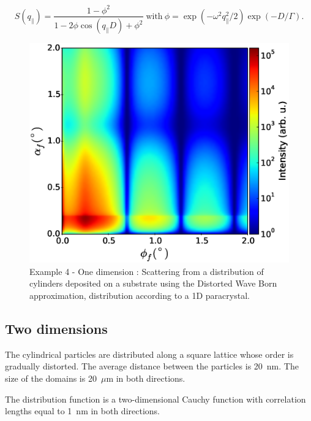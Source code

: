 \begin{equation*}
S(q_{\parallel})= \frac{1-\phi^2 }{1-2\phi\cos(q_{\parallel} D)+\phi^2} \; \textrm{with} \ \phi=\exp(-\omega^2 q_{\parallel}^2/2)\exp(-D/\Gamma).
\end{equation*}


\begin{figure}[H]
\includegraphics[width=.49\textwidth]{Figures/figure_ex0041DDL.eps}
\caption{Example 4 - One dimension : Scattering from a distribution of cylinders deposited on a substrate using the Distorted Wave Born approximation, distribution according to a 1D paracrystal.}
\label{fig:PythonEx41DDL}
\end{figure}


\subsection{Two dimensions}
The cylindrical particles are distributed along a square lattice whose order is gradually distorted.
The average distance between the particles is 20~nm. The size of the domains is 20~$\mu$m in both directions.

The distribution function is a two-dimensional Cauchy function with correlation lengths equal to 1~nm in both directions.


